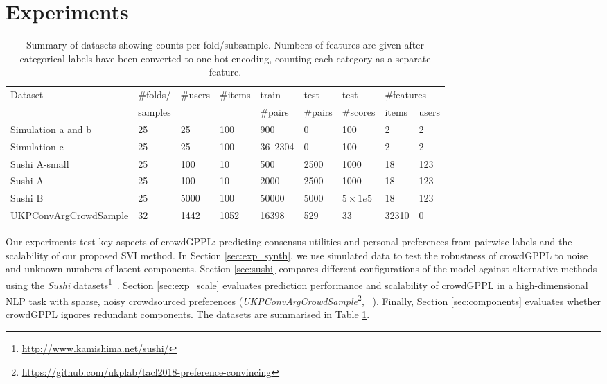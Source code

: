 \section{Experiments}\label{sec:expts}

\begin{table}[h]
\centering
\small
 \setlength{\tabcolsep}{4pt}
\begin{tabular}{l l l l@{\hskip 0.3cm} l@{\hskip 0.3cm} l l@{\hskip 0.3cm} l l }
\toprule
Dataset & \#folds/ & \#users & \#items & train & test & test & \multicolumn{2}{l}{\#features} \\
              & samples &              &               & \#pairs  & \#pairs & \#scores          & items & users \\
\midrule
Simulation a and b & 25 & 25 & 100 & 900 & 0 & 100 & 2 & 2 \\
Simulation c & 25 & 25 & 100 & 36--2304 & 0 & 100 & 2 & 2\\
\midrule
Sushi A-small & 25 & 100 & 10 & 500 & 2500 & 1000 & 18 & 123 \\
Sushi A & 25 & 100 & 10 & 2000 & 2500 & 1000 & 18 & 123 \\
Sushi B & 25 & 5000 & 100 & 50000 & 5000 & $5\times 1e5$ &  18 & 123 \\
\midrule
UKPConvArgCrowdSample & 32 & 1442 & 1052 & 16398 & 529 & 33 & 32310 & 0
\\ \bottomrule
\end{tabular}
\caption{Summary of datasets showing counts per fold/subsample. 
Numbers of features are given after categorical labels have been converted to one-hot encoding, counting
each category as a separate feature.
}
\label{tab:datasets}
\end{table}
Our experiments test key aspects of crowdGPPL: 
 predicting consensus utilities and personal preferences from pairwise labels
 and the scalability of our proposed SVI method.
In Section \ref{sec:exp_synth}, we use simulated data to test the robustness of crowdGPPL
to noise and unknown numbers of latent components.
Section \ref{sec:sushi}
compares different configurations of the model
against alternative methods
using the \emph{Sushi} datasets\footnote{\url{http://www.kamishima.net/sushi/}}~\citep{kamishima2003nantonac}.
Section \ref{sec:exp_scale} evaluates prediction performance and scalability of
 crowdGPPL %
in a high-dimensional
NLP task
with sparse, noisy crowdsourced preferences
(\emph{UKPConvArgCrowdSample}\footnote{\url{https://github.com/ukplab/tacl2018-preference-convincing}}, ~\citet{simpson2018finding}).
Finally, Section \ref{sec:components} evaluates whether crowdGPPL ignores redundant
components.
The datasets are summarised in Table \ref{tab:datasets}.

